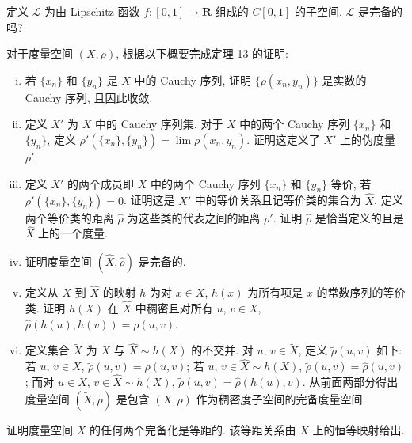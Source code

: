 \documentclass[../../main.tex]{subfiles}
\begin{document}
\begin{exercise}\label{exercise:ch09-49}
定义 $\mathcal{L}$ 为由 Lipschitz 函数 $f:[0,1]\to\mathbf{R}$ 组成的 $C[0,1]$ 的子空间. $\mathcal{L}$ 是完备的吗?
\end{exercise}

\begin{exercise}\label{exercise:ch09-50}
对于度量空间 $(X,\rho)$, 根据以下概要完成定理 13 的证明:
\begin{enumerate}[(i)]
\item 若 $\{x_{n}\}$ 和 $\{y_{n}\}$ 是 $X$ 中的 Cauchy 序列, 证明 $\{\rho(x_{n},y_{n})\}$ 是实数的 Cauchy 序列, 且因此收敛.
\item 定义 $X'$ 为 $X$ 中的 Cauchy 序列集. 对于 $X$ 中的两个 Cauchy 序列 $\{x_{n}\}$ 和 $\{y_{n}\}$, 定义 $\rho'(\{x_{n}\},\{y_{n}\})=\lim\rho(x_{n},y_{n})$. 证明这定义了 $X'$ 上的伪度量 $\rho'$.
\item 定义 $X'$ 的两个成员即 $X$ 中的两个 Cauchy 序列 $\{x_{n}\}$ 和 $\{y_{n}\}$ 等价, 若 $\rho'(\{x_{n}\},\{y_{n}\})=0$. 证明这是 $X'$ 中的等价关系且记等价类的集合为 $\widehat{X}$. 定义两个等价类的距离 $\widehat{\rho}$ 为这些类的代表之间的距离 $\rho'$. 证明 $\widehat{\rho}$ 是恰当定义的且是 $\widehat{X}$ 上的一个度量.
\item 证明度量空间 $(\widehat{X},\widehat{\rho})$ 是完备的.
\item 定义从 $X$ 到 $\widehat{X}$ 的映射 $h$ 为对 $x\in X$, $h(x)$ 为所有项是 $x$ 的常数序列的等价类. 证明 $h(X)$ 在 $\widehat{X}$ 中稠密且对所有 $u$, $v\in X$, $\widehat{\rho}(h(u),h(v))=\rho(u,v)$.
\item 定义集合 $\widetilde{X}$ 为 $X$ 与 $\widehat{X}\sim h(X)$ 的不交并. 对 $u$, $v\in\widetilde{X}$, 定义 $\widetilde{\rho}(u,v)$ 如下: 若 $u$, $v\in X$, $\widetilde{\rho}(u,v)=\rho(u,v)$; 若 $u$, $v\in\widehat{X}\sim h(X)$, $\widetilde{\rho}(u,v)=\widehat{\rho}(u,v)$; 而对 $u\in X$, $v\in\widehat{X}\sim h(X)$, $\widetilde{\rho}(u,v)=\widehat{\rho}(h(u),v)$. 从前面两部分得出度量空间 $(\widetilde{X},\widetilde{\rho})$ 是包含 $(X,\rho)$ 作为稠密度子空间的完备度量空间.
\end{enumerate}
\end{exercise}

\begin{exercise}\label{exercise:ch09-51}
证明度量空间 $X$ 的任何两个完备化是等距的. 该等距关系由 $X$ 上的恒等映射给出.
\end{exercise}
\end{document}
